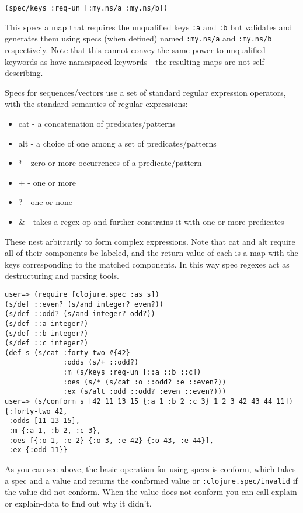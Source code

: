 \begin{verbatim}
(spec/keys :req-un [:my.ns/a :my.ns/b])
\end{verbatim}

This specs a map that requires the unqualified keys \texttt{:a} and \texttt{:b}
but validates and generates them using specs (when defined) named
\texttt{:my.ns/a} and \texttt{:my.ns/b} respectively. Note that this cannot
convey the same power to unqualified keywords as have namespaced keywords - the
resulting maps are not self-describing.

Specs for sequences/vectors use a set of standard regular expression operators,
with the standard semantics of regular expressions:

\begin{itemize}
\item cat - a concatenation of predicates/patterns
\item alt - a choice of one among a set of predicates/patterns
\item * - zero or more occurrences of a predicate/pattern
\item + - one or more
\item ? - one or none
\item \& - takes a regex op and further constrains it with one or more predicates
\end{itemize}

These nest arbitrarily to form complex expressions. Note that cat and alt
require all of their components be labeled, and the return value of each is a
map with the keys corresponding to the matched components. In this way spec
regexes act as destructuring and parsing tools.

\begin{verbatim}
user=> (require [clojure.spec :as s])
(s/def ::even? (s/and integer? even?))
(s/def ::odd? (s/and integer? odd?))
(s/def ::a integer?)
(s/def ::b integer?)
(s/def ::c integer?)
(def s (s/cat :forty-two #{42}
              :odds (s/+ ::odd?)
              :m (s/keys :req-un [::a ::b ::c])
              :oes (s/* (s/cat :o ::odd? :e ::even?))
              :ex (s/alt :odd ::odd? :even ::even?)))
user=> (s/conform s [42 11 13 15 {:a 1 :b 2 :c 3} 1 2 3 42 43 44 11])
{:forty-two 42,
 :odds [11 13 15],
 :m {:a 1, :b 2, :c 3},
 :oes [{:o 1, :e 2} {:o 3, :e 42} {:o 43, :e 44}],
 :ex {:odd 11}}
\end{verbatim}

As you can see above, the basic operation for using specs is conform, which
takes a spec and a value and returns the conformed value or
\texttt{:clojure.spec/invalid} if the value did not conform. When the value does
not conform you can call explain or explain-data to find out why it didn’t.


